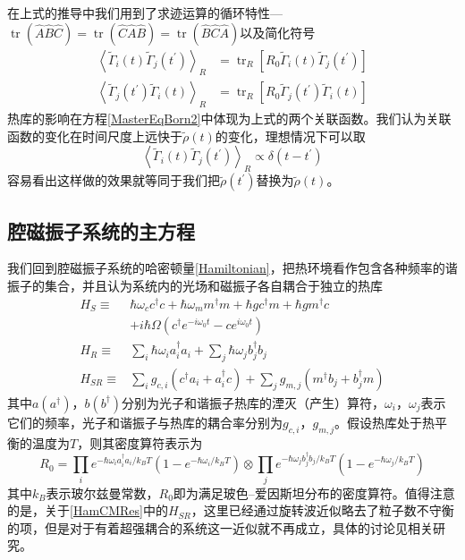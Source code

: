 在上式的推导中我们用到了求迹运算的循环特性---$\operatorname{tr}\left( \hat{A} \hat{B} \hat{C} \right)=\operatorname{tr}\left(\hat{C} \hat{A} \hat{B} \right)= \operatorname{tr} \left( \hat{B} \hat{C} \hat{A} \right)$以及简化符号
\begin{equation}
\begin{aligned}
\left\langle\tilde{\Gamma}_{i}(t) \tilde{\Gamma}_{j}\left(t^{\prime}\right)\right\rangle_{R} &=\operatorname{tr}_{R}\left[R_{0} \tilde{\Gamma}_{i}(t) \tilde{\Gamma}_{j}\left(t^{\prime}\right)\right] \\
\left\langle\tilde{\Gamma}_{j}\left(t^{\prime}\right) \tilde{\Gamma}_{i}(t)\right\rangle_{R} &=\operatorname{tr}_{R}\left[R_{0} \tilde{\Gamma}_{j}\left(t^{\prime}\right) \tilde{\Gamma}_{i}(t)\right]
\end{aligned}
\end{equation}
热库的影响在方程\eqref{MasterEqBorn2}中体现为上式的两个关联函数。我们认为关联函数的变化在时间尺度上远快于$\tilde{\rho}(t)$的变化，理想情况下可以取
\begin{equation}
\left\langle\tilde{\Gamma}_{i}(t) \tilde{\Gamma}_{j}\left(t^{\prime}\right)\right\rangle_{R} \propto \delta\left(t-t^{\prime}\right)
\end{equation}
容易看出这样做的效果就等同于我们把$\tilde{\rho}(t^{\prime})$替换为$\tilde{\rho}(t)$。

\subsection{腔磁振子系统的主方程}
我们回到腔磁振子系统的哈密顿量\eqref{Hamiltonian}，把热环境看作包含各种频率的谐振子的集合，并且认为系统内的光场和磁振子各自耦合于独立的热库
\begin{equation}
\begin{aligned}
H_S\equiv{}&\hbar\omega_{c}c^{\dag}c+\hbar\omega_{m}m^{\dag}m+\hbar gc^{\dag}m+\hbar gm^{\dag}c \\
&+i\hbar\Omega(c^{\dag}e^{-i\omega_{0}t}-ce^{i\omega_{0}t}) \\
H_{R}\equiv&\sum_{i}\hbar\omega_{i}a_{i}^{\dag}a_{i}+\sum_{j}\hbar\omega_{j}b_{j}^{\dag}b_{j} \\
H_{SR}\equiv&\sum_{i}g_{c,i}(c^{\dag}a_{i}+a_{i}^{\dag}c)+\sum_{j}g_{m,j}(m^{\dag}b_{j}+b_{j}^{\dag}m)
\label{HamCMRes}
\end{aligned}
\end{equation}
其中$a(a^{\dag})$，$b(b^{\dag})$分别为光子和谐振子热库的湮灭（产生）算符，$\omega_{i}$，$\omega_{j}$表示它们的频率，光子和谐振子与热库的耦合率分别为$g_{c,i}$，$g_{m,j}$。假设热库处于热平衡的温度为$T$，则其密度算符表示为
\begin{equation}
R_{0}=\prod_{i} e^{-\hbar \omega_{i} a_{i}^{\dag}a_{i} / k_{B} T}\left(1-e^{-\hbar \omega_{i} / k_{B} T}\right) \otimes \prod_{j} e^{-\hbar \omega_{j} b_{j}^{\dag}b_{j} / k_{B} T}\left(1-e^{-\hbar \omega_{j} / k_{B} T}\right)
\label{ThermalState}
\end{equation}
其中$k_{B}$表示玻尔兹曼常数，$R_{0}$即为满足玻色--爱因斯坦分布的密度算符。值得注意的是，关于\eqref{HamCMRes}中的$H_{SR}$，这里已经通过旋转波近似略去了粒子数不守衡的项，但是对于有着超强耦合的系统这一近似就不再成立，具体的讨论见相关研究\cite{}。


